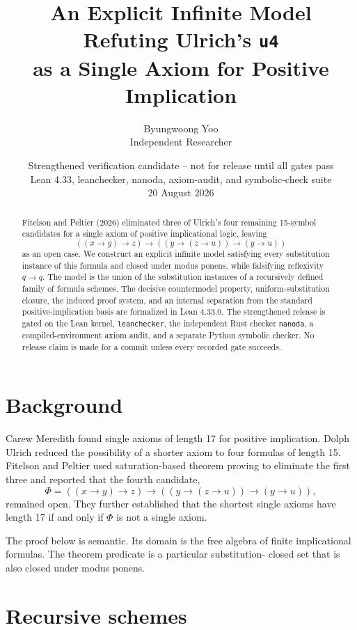 \documentclass[11pt]{article}
\title{An Explicit Infinite Model Refuting Ulrich's \texttt{u4}\\
as a Single Axiom for Positive Implication}
\author{Byungwoong Yoo\\Independent Researcher}
\date{Strengthened verification candidate -- not for release until all gates pass\\
Lean 4.33, leanchecker, nanoda, axiom-audit, and symbolic-check suite\\
20 August 2026}
\newcommand{\Imp}{\mathbin{\to}}
\begin{document}
\maketitle

\begin{abstract}
Fitelson and Peltier (2026) eliminated three of Ulrich's four remaining
15-symbol candidates for a single axiom of positive implicational logic,
leaving
\[
((x\Imp y)\Imp z)\Imp((y\Imp(z\Imp u))\Imp(y\Imp u))
\]
as an open case.  We construct an explicit infinite model satisfying every
substitution instance of this formula and closed under modus ponens, while
falsifying reflexivity $q\Imp q$.  The model is the union of the substitution
instances of a recursively defined family of formula schemes.  The decisive
countermodel property, uniform-substitution closure, the induced proof system,
and an internal separation from the standard positive-implication basis are
formalized in Lean 4.33.0.  The strengthened release is gated on the Lean
kernel, \texttt{leanchecker}, the independent Rust checker \texttt{nanoda}, a
compiled-environment axiom audit, and a separate Python symbolic checker.  No
release claim is made for a commit unless every recorded gate succeeds.
\end{abstract}

\section{Background}

Carew Meredith found single axioms of length 17 for positive implication.
Dolph Ulrich reduced the possibility of a shorter axiom to four formulas of
length 15.  Fitelson and Peltier used saturation-based theorem proving to
eliminate the first three and reported that the fourth candidate,
\begin{equation}\label{eq:u4}
\Phi=((x\Imp y)\Imp z)\Imp((y\Imp(z\Imp u))\Imp(y\Imp u)),
\end{equation}
remained open.  They further established that the shortest single axioms
have length 17 if and only if $\Phi$ is not a single axiom.

The proof below is semantic.  Its domain is the free algebra of finite
implicational formulas.  The theorem predicate is a particular substitution-
closed set that is also closed under modus ponens.

\section{Recursive schemes}
\end{document}
